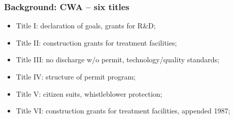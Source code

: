 \documentclass[aspectratio=169]{beamer}
\theoremstyle{principle}
\begin{document}
\begin{frame}
\frametitle{Background: CWA -- six titles}

\begin{itemize}

\item Title I: declaration of goals, grants for R\&D;
\bigskip
\item Title II: construction grants for treatment facilities;
\bigskip
\item Title III: no discharge w/o permit, technology/quality standards;
\bigskip
\item Title IV: structure of permit program;
\bigskip
\item Title V: citizen suits, whistleblower protection;
\bigskip
\item Title VI: construction grants for treatment facilities, appended 1987;


\end{itemize}

\end{frame}
\end{document}
